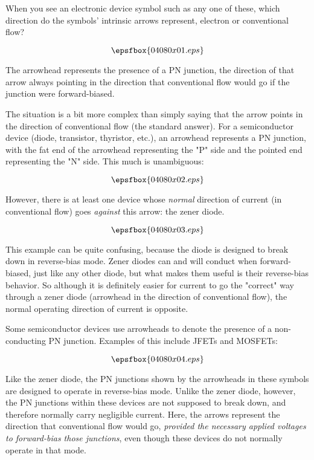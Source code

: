 

When you see an electronic device symbol such as any one of these, which direction do the symbols' intrinsic arrows represent, electron or conventional flow? 

$$\epsfbox{04080x01.eps}$$







The arrowhead represents the presence of a PN junction, the direction of that arrow always pointing in the direction that conventional flow would go if the junction were forward-biased.

\vskip 10pt

The situation is a bit more complex than simply saying that the arrow points in the direction of conventional flow (the standard answer).  For a semiconductor device (diode, transistor, thyristor, etc.), an arrowhead represents a PN junction, with the fat end of the arrowhead representing the "P" side and the pointed end representing the "N" side.  This much is unambiguous:

$$\epsfbox{04080x02.eps}$$

However, there is at least one device whose {\it normal} direction of current (in conventional flow) goes {\it against} this arrow: the zener diode.

$$\epsfbox{04080x03.eps}$$

This example can be quite confusing, because the diode is designed to break down in reverse-bias mode.  Zener diodes can and will conduct when forward-biased, just like any other diode, but what makes them useful is their reverse-bias behavior.  So although it is definitely easier for current to go the "correct" way through a zener diode (arrowhead in the direction of conventional flow), the normal operating direction of current is opposite.

\goodbreak

Some semiconductor devices use arrowheads to denote the presence of a non-conducting PN junction.  Examples of this include JFETs and MOSFETs:

$$\epsfbox{04080x04.eps}$$

Like the zener diode, the PN junctions shown by the arrowheads in these symbols are designed to operate in reverse-bias mode.  Unlike the zener diode, however, the PN junctions within these devices are not supposed to break down, and therefore normally carry negligible current.  Here, the arrows represent the direction that conventional flow would go, {\it provided the necessary applied voltages to forward-bias those junctions}, even though these devices do not normally operate in that mode.

